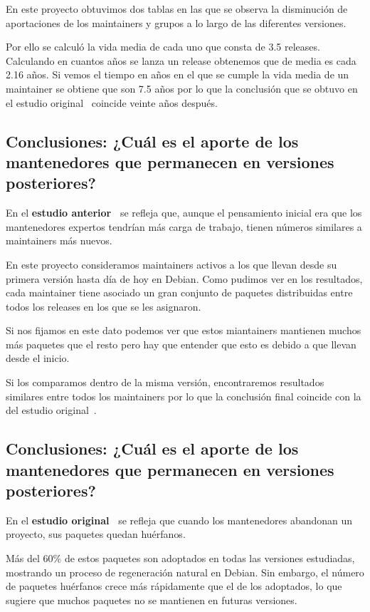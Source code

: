 \documentclass[a4paper, 12pt]{book}
\begin{document}
En este proyecto obtuvimos dos tablas en las que se observa la disminución de aportaciones de los maintainers y grupos a lo largo de las diferentes versiones.

Por ello se calculó la vida media de cada uno que consta de 3.5 releases. Calculando en cuantos años se lanza un release obtenemos que de media es cada 2.16 años. Si vemos el tiempo en años en el que se cumple la vida media de un maintainer se obtiene que son 7.5 años por lo que la conclusión que se obtuvo en el estudio original~\cite{robles05:_debian} coincide veinte años después.

\subsection{Conclusiones: ¿Cuál es el aporte de los mantenedores que permanecen en versiones posteriores?}
\label{subsec:conclusion_4}

En el \textbf{estudio anterior~\cite{robles05:_debian}} se refleja que, aunque el pensamiento inicial era que los mantenedores expertos tendrían más carga de trabajo, tienen números similares a maintainers más nuevos.

En este proyecto consideramos maintainers activos a los que llevan desde su primera versión hasta día de hoy en Debian. Como pudimos ver en los resultados, cada maintainer tiene asociado un gran conjunto de paquetes distribuidas entre todos los releases en los que se les asignaron.

Si nos fijamos en este dato podemos ver que estos miantainers mantienen muchos más paquetes que el resto pero hay que entender que esto es debido a que llevan desde el inicio.

Si los comparamos dentro de la misma versión, encontraremos resultados similares entre todos los maintainers por lo que la conclusión final coincide con la del estudio original~\cite{robles05:_debian}. 

\subsection{Conclusiones: ¿Cuál es el aporte de los mantenedores que permanecen en versiones posteriores?}
\label{subsec:conclusion_5}

En el \textbf{estudio original~\cite{robles05:_debian}} se refleja que cuando los mantenedores abandonan un proyecto, sus paquetes quedan huérfanos. 

Más del 60\% de estos paquetes son adoptados en todas las versiones estudiadas, mostrando un proceso de regeneración natural en Debian. Sin embargo, el número de paquetes huérfanos crece más rápidamente que el de los adoptados, lo que sugiere que muchos paquetes no se mantienen en futuras versiones. 
\end{document}
